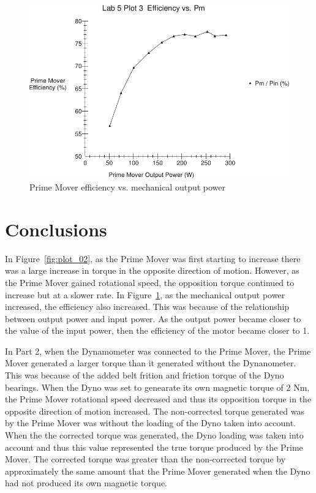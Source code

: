 \documentclass{article}
\begin{document}
\begin{figure}[H]
  \centering
  \includegraphics[width=\textwidth]{img/plot3}
  \caption{Prime Mover efficiency vs. mechanical output power}
  \label{fig:plot_03}
\end{figure}

\section{Conclusions}
In Figure~\ref{fig:plot_02}, as the Prime Mover was first starting to increase there was a large increase
in torque in the opposite direction of motion. However, as the Prime Mover gained rotational speed, the 
opposition torque continued to increase but at a slower rate. In Figure~\ref{fig:plot_03}, as the mechanical
output power increased, the efficiency also increased. This was because of the relationship between output
power and input power. As the output power became closer to the value of the input power, then the efficiency 
of the motor became closer to 1. 

In Part 2, when the Dynamometer was connected to the Prime Mover, the Prime Mover generated a larger torque
than it generated without the Dynanometer. This was because of the added belt frition and friction torque of the 
Dyno bearings. When the Dyno was set to genearate its own magnetic torque of 2 Nm, the Prime Mover rotational speed 
decreased and thus its opposition torque in the opposite direction of motion increased. The non-corrected torque 
generated was by the Prime Mover was without the loading of the Dyno taken into account. When the the corrected
torque was generated, the Dyno loading was taken into account and thus this value represented the true torque 
produced by the Prime Mover. The corrected torque was greater than the non-corrected torque by approximately the 
same amount that the Prime Mover generated when the Dyno had not produced its own magnetic torque.
\end{document}
